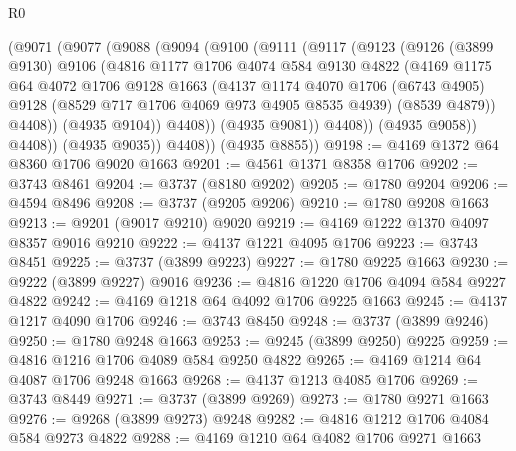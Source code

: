 \begin{lexlean}{R0}
\begin{coremodule}
            (@9071
              (@9077
                (@9088
                  (@9094
                    (@9100
                      (@9111
                        (@9117
                          (@9123
                            (@9126
                              (@3899 @9130)
                              @9106
                              (@4816
                                @1177
                                @1706
                                @4074
                                @584
                                @9130
                                @4822
                                (@4169
                                  @1175
                                  @64
                                  @4072
                                  @1706
                                  @9128
                                  @1663
                                  (@4137
                                    @1174
                                    @4070
                                    @1706
                                    (@6743 @4905)
                                    @9128
                                    (@8529 @717 @1706 @4069 @973 @4905 @8535 @4939)
                                    (@8539 @4879))
                                  @4408))
                              (@4935 @9104))
                            @4408))
                        (@4935 @9081))
                      @4408))
                  (@4935 @9058))
                @4408))
            (@4935 @9035))
          @4408))
      (@4935 @8855))
@9198 := @4169 @1372 @64 @8360 @1706 @9020 @1663
@9201 := @4561 @1371 @8358 @1706
@9202 := @3743 @8461
@9204 := @3737 (@8180 @9202)
@9205 := @1780 @9204
@9206 := @4594 @8496
@9208 := @3737 (@9205 @9206)
@9210 := @1780 @9208 @1663
@9213 := @9201 (@9017 @9210) @9020
@9219 := @4169 @1222 @1370 @4097 @8357 @9016 @9210
@9222 := @4137 @1221 @4095 @1706
@9223 := @3743 @8451
@9225 := @3737 (@3899 @9223)
@9227 := @1780 @9225 @1663
@9230 := @9222 (@3899 @9227) @9016
@9236 := @4816 @1220 @1706 @4094 @584 @9227 @4822
@9242 := @4169 @1218 @64 @4092 @1706 @9225 @1663
@9245 := @4137 @1217 @4090 @1706
@9246 := @3743 @8450
@9248 := @3737 (@3899 @9246)
@9250 := @1780 @9248 @1663
@9253 := @9245 (@3899 @9250) @9225
@9259 := @4816 @1216 @1706 @4089 @584 @9250 @4822
@9265 := @4169 @1214 @64 @4087 @1706 @9248 @1663
@9268 := @4137 @1213 @4085 @1706
@9269 := @3743 @8449
@9271 := @3737 (@3899 @9269)
@9273 := @1780 @9271 @1663
@9276 := @9268 (@3899 @9273) @9248
@9282 := @4816 @1212 @1706 @4084 @584 @9273 @4822
@9288 := @4169 @1210 @64 @4082 @1706 @9271 @1663

\end{coremodule}
\end{lexlean}
